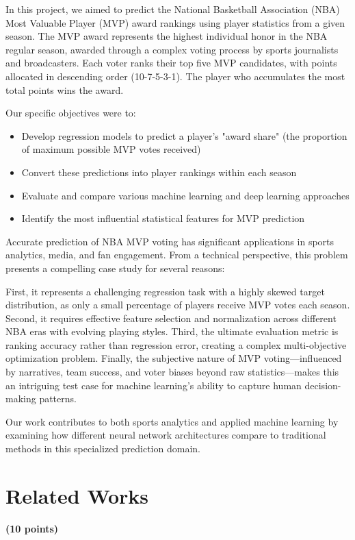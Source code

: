 \documentclass[10pt,twocolumn,letterpaper]{article}
\begin{document}
In this project, we aimed to predict the National Basketball Association (NBA) Most Valuable Player (MVP) award rankings using player statistics from a given season. The MVP award represents the highest individual honor in the NBA regular season, awarded through a complex voting process by sports journalists and broadcasters. Each voter ranks their top five MVP candidates, with points allocated in descending order (10-7-5-3-1). The player who accumulates the most total points wins the award.

Our specific objectives were to:
\begin{itemize}
    \item Develop regression models to predict a player's "award share" (the proportion of maximum possible MVP votes received)
    \item Convert these predictions into player rankings within each season
    \item Evaluate and compare various machine learning and deep learning approaches
    \item Identify the most influential statistical features for MVP prediction
\end{itemize}

Accurate prediction of NBA MVP voting has significant applications in sports analytics, media, and fan engagement. From a technical perspective, this problem presents a compelling case study for several reasons:

First, it represents a challenging regression task with a highly skewed target distribution, as only a small percentage of players receive MVP votes each season. Second, it requires effective feature selection and normalization across different NBA eras with evolving playing styles. Third, the ultimate evaluation metric is ranking accuracy rather than regression error, creating a complex multi-objective optimization problem. Finally, the subjective nature of MVP voting—influenced by narratives, team success, and voter biases beyond raw statistics—makes this an intriguing test case for machine learning's ability to capture human decision-making patterns.

Our work contributes to both sports analytics and applied machine learning by examining how different neural network architectures compare to traditional methods in this specialized prediction domain.

\section{Related Works}
\textbf{(10 points)}
\end{document}
